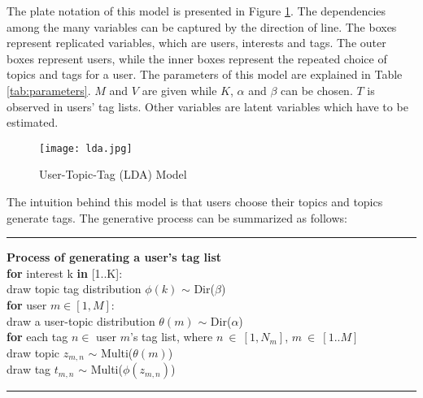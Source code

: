 The plate notation of this model is presented in Figure \ref{fig:lda}. 
The dependencies among the many variables can be captured by the direction of line. 
The boxes represent replicated variables, which are users, interests and tags. The outer boxes represent users, while the inner boxes represent the repeated choice of topics and tags for a user. The parameters of this model are explained in Table \ref{tab:parameters}.
$M$ and $V$ are given while $K$, $\alpha$ and $\beta$ can be chosen. $T$ is observed in users' tag lists. Other variables are latent variables which have to be estimated.

\begin{figure}[htbp]\centering
\texttt{[image: lda.jpg]}  %
\caption{User-Topic-Tag (LDA) Model}
\label{fig:lda}
\end{figure}

The intuition behind this model is that users choose their topics and topics generate tags.
The generative process can be summarized as follows:

\noindent\rule[0.5ex]{\linewidth}{1pt}
\textbf{Process of generating a user's tag list}\\
\noindent \textbf{for} interest k \textbf{in} [1..K]:\\
\indent draw topic tag distribution $\phi(k)$ $\sim$ Dir($\beta$)\\
\noindent \textbf{for} user $m \in [1,M]$:\\
\indent draw a user-topic distribution $\theta(m)$ $\sim$ Dir($\alpha$)\\  
\indent \textbf{for} each tag $n \in$   user $m$'s tag list, where $n~\in~[1,N_m]$, $m~\in~[1..M]$\\
\indent \indent draw topic $z_{m,n}$  $\sim$ Multi($\theta(m)$)\\
\indent \indent draw tag $t_{m,n}$ $\sim$ Multi($\phi(z_{m,n})$)\\ 
\noindent\rule[0.5ex]{\linewidth}{1pt}

